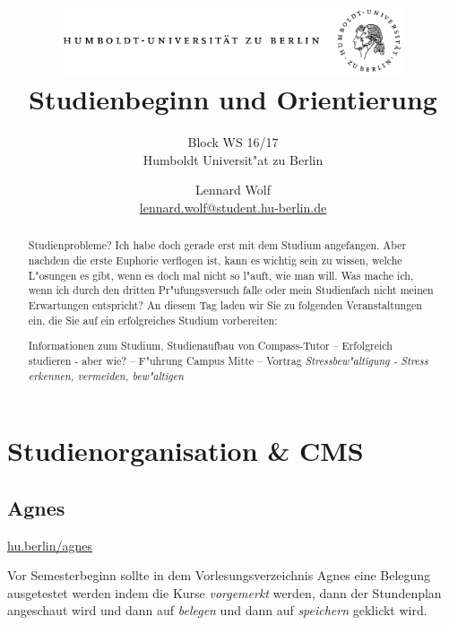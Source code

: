 \documentclass[]{scrartcl}
\begin{document}
\title{
	\includegraphics*[width=0.75\textwidth]{images/hu_logo.png}\\
	\vspace{24pt}
	Studienbeginn und Orientierung}
\subtitle{Block WS 16/17\\
          Humboldt Universit"at zu Berlin}
\author{Lennard Wolf\\
        \href{mailto:lennard.wolf@student.hu-berlin.de}{lennard.wolf@student.hu-berlin.de}}
\maketitle
\begin{abstract}

Studienprobleme? Ich habe doch gerade erst mit dem Studium angefangen. Aber nachdem die erste Euphorie verflogen ist, kann es wichtig sein zu wissen, welche L"osungen es gibt, wenn es doch mal nicht so l"auft, wie man will. Was mache ich, wenn ich durch den dritten Pr"ufungsversuch falle oder mein Studienfach nicht meinen Erwartungen entspricht? An diesem Tag laden wir Sie zu folgenden Veranstaltungen ein, die Sie auf ein erfolgreiches Studium vorbereiten:

Informationen zum Studium, Studienaufbau von Compass-Tutor -- Erfolgreich studieren - aber wie? -- F"uhrung Campus Mitte -- Vortrag \emph{Stressbew"altigung - Stress erkennen, vermeiden, bew"altigen}

\end{abstract}
\newpage

\tableofcontents
\newpage

\section{Studienorganisation \& CMS}

\subsection{Agnes}
\url{hu.berlin/agnes}
\newline

Vor Semesterbeginn sollte in dem Vorlesungsverzeichnis Agnes eine Belegung ausgetestet werden indem die Kurse \emph{vorgemerkt} werden, dann der Stundenplan angeschaut wird und dann auf \emph{belegen} und dann auf \emph{speichern} geklickt wird.
\end{document}
